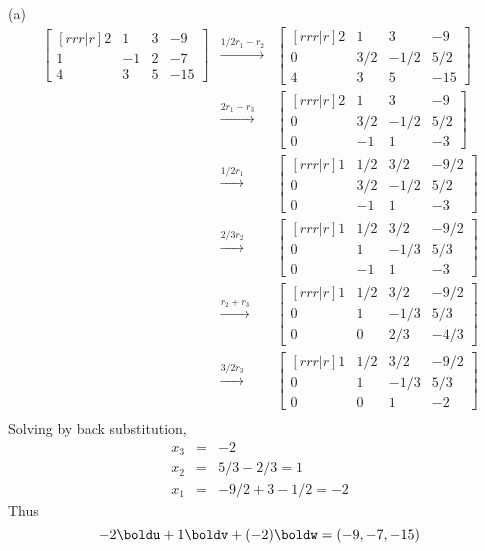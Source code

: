 \ee
\begin{solution}
\noindent (a) 
\begin{eqnarray*}
\begin{bmatrix}[rrr|r]
2&1&3&-9\\
1&-1&2&-7\\
4&3&5&-15
\end{bmatrix}
&\xrightarrow[]{1/2r_1 - r_2}&
\begin{bmatrix}[rrr|r]
2&1&3&-9\\
0&3/2&-1/2&5/2\\
4&3&5&-15
\end{bmatrix}\\
&\xrightarrow[]{2r_1 - r_3}&
\begin{bmatrix}[rrr|r]
2&1&3&-9\\
0&3/2&-1/2&5/2\\
0&-1&1&-3
\end{bmatrix}\\
&\xrightarrow[]{1/2r_1}&
\begin{bmatrix}[rrr|r]
1&1/2&3/2&-9/2\\
0&3/2&-1/2&5/2\\
0&-1&1&-3
\end{bmatrix}\\
&\xrightarrow[]{2/3r_2}&
\begin{bmatrix}[rrr|r]
1&1/2&3/2&-9/2\\
0&1&-1/3&5/3\\
0&-1&1&-3
\end{bmatrix}\\
&\xrightarrow[]{r_2 + r_3}&
\begin{bmatrix}[rrr|r]
1&1/2&3/2&-9/2\\
0&1&-1/3&5/3\\
0&0&2/3&-4/3
\end{bmatrix}\\
&\xrightarrow[]{3/2r_3}&
\begin{bmatrix}[rrr|r]
1&1/2&3/2&-9/2\\
0&1&-1/3&5/3\\
0&0&1&-2
\end{bmatrix}\\
\end{eqnarray*}
Solving by back substitution,
\begin{eqnarray*}
x_3 &=& -2\\
x_2 &=& 5/3 - 2/3 = 1\\
x_1 &=& -9/2 + 3 - 1/2 = -2
\end{eqnarray*}
Thus
$$
-2\boldu + 1\boldv +(-2)\boldw = (-9,-7,-15)
$$
\end{solution}

